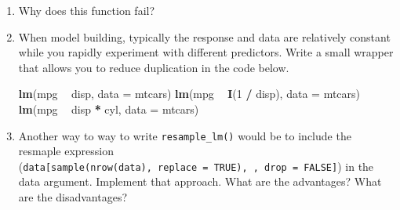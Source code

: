 \documentclass[]{book}
\newenvironment{Shaded}{\begin{snugshade}}{\end{snugshade}}
\newcommand{\CommentTok}[1]{\textcolor[rgb]{0.37,0.37,0.37}{\textit{#1}}}
\newcommand{\ControlFlowTok}[1]{\textcolor[rgb]{0.27,0.27,0.27}{\textbf{#1}}}
\newcommand{\DataTypeTok}[1]{\textcolor[rgb]{0.27,0.27,0.27}{#1}}
\newcommand{\DecValTok}[1]{\textcolor[rgb]{0.06,0.06,0.06}{#1}}
\newcommand{\KeywordTok}[1]{\textcolor[rgb]{0.27,0.27,0.27}{\textbf{#1}}}
\newcommand{\NormalTok}[1]{#1}
\newcommand{\OperatorTok}[1]{\textcolor[rgb]{0.43,0.43,0.43}{\textbf{#1}}}
\newcommand{\StringTok}[1]{\textcolor[rgb]{0.5,0.5,0.5}{#1}}
\begin{document}
\begin{enumerate}
\def\labelenumi{\arabic{enumi}.}
\item
  Why does this function fail?

\begin{Shaded}
\end{Shaded}
\item
  When model building, typically the response and data are relatively
  constant while you rapidly experiment with different predictors. Write a
  small wrapper that allows you to reduce duplication in the code below.

\begin{Shaded}
\begin{Highlighting}[]
\KeywordTok{lm}\NormalTok{(mpg }\OperatorTok{~}\StringTok{ }\NormalTok{disp, }\DataTypeTok{data =}\NormalTok{ mtcars)}
\KeywordTok{lm}\NormalTok{(mpg }\OperatorTok{~}\StringTok{ }\KeywordTok{I}\NormalTok{(}\DecValTok{1} \OperatorTok{/}\StringTok{ }\NormalTok{disp), }\DataTypeTok{data =}\NormalTok{ mtcars)}
\KeywordTok{lm}\NormalTok{(mpg }\OperatorTok{~}\StringTok{ }\NormalTok{disp }\OperatorTok{*}\StringTok{ }\NormalTok{cyl, }\DataTypeTok{data =}\NormalTok{ mtcars)}
\end{Highlighting}
\end{Shaded}
\item
  Another way to way to write \texttt{resample\_lm()} would be to include the
  resmaple expression (\texttt{data{[}sample(nrow(data),\ replace\ =\ TRUE),\ ,\ drop\ =\ FALSE{]}})
  in the data argument. Implement that approach. What are the advantages?
  What are the disadvantages?
\end{enumerate}
\end{document}
